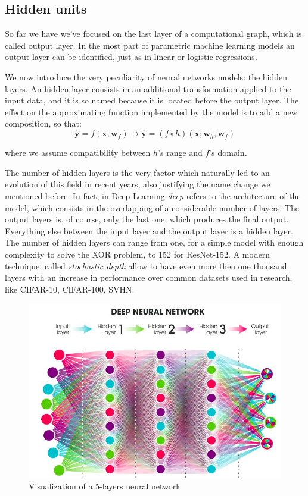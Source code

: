 \documentclass[a4paper, twoside]{article}
\begin{document}
    \subsection{Hidden units}

        So far we have we've focused on the last layer of a computational graph, which is called output layer. In the most part of parametric machine learning models an output layer can be identified, just as in linear or logistic regressions.

        We now introduce the very peculiarity of neural networks models: the hidden layers. An hidden layer consists in an additional transformation applied to the input data, and it is so named because it is located before the output layer. The effect on the approximating function implemented by the model is to add a new composition, so that:
        $$\hat{\boldsymbol{y}} = f(\boldsymbol{x}; \boldsymbol{w}_f) \rightarrow \hat{\boldsymbol{y}} = (f \circ h)(\boldsymbol{x}; \boldsymbol{w}_h, \boldsymbol{w}_f) $$

        where we assume compatibility between $h$'s range and $f$'s domain.

        The number of hidden layers is the very factor which naturally led to an evolution of this field in recent years, also justifying the name change we mentioned before. In fact, in Deep Learning \textit{deep} refers to the architecture of the model, which consists in the overlapping of a considerable number of layers. The output layers is, of course, only the last one, which produces the final output. Everything else between the input layer and the output layer is a hidden layer. The number of hidden layers can range from one, for a simple model with enough complexity to solve the XOR problem, to 152 for ResNet-152. A modern technique, called \textit{stochastic depth} allow to have even more then one thousand layers with an increase in performance over common datasets used in research, like CIFAR-10, CIFAR-100, SVHN.

        \begin{figure}[H]
        \centering
        \includegraphics[width=0.6\linewidth]{dnn.png}
        \caption{Visualization of a 5-layers neural network}
        \end{figure}
\end{document}
